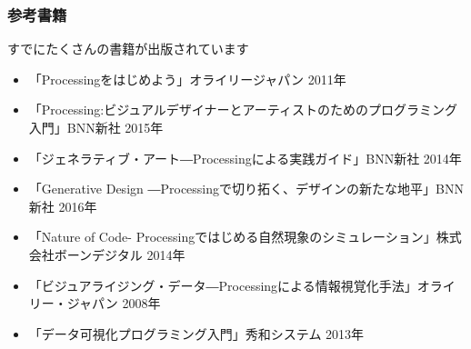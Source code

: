 \documentclass[dvipdfmx]{beamer}
\begin{document}
        \begin{frame}
            \frametitle{参考書籍}
            \tiny
            \begin{block}{すでにたくさんの書籍が出版されています}
                \begin{itemize}
                    \item 「Processingをはじめよう」オライリージャパン 2011年
                    \item 「Processing:ビジュアルデザイナーとアーティストのためのプログラミング入門」BNN新社 2015年
                    \item 「ジェネラティブ・アート―Processingによる実践ガイド」BNN新社 2014年
                    \item 「Generative Design ―Processingで切り拓く、デザインの新たな地平」BNN新社 2016年
                    \item 「Nature of Code- Processingではじめる自然現象のシミュレーション」株式会社ボーンデジタル 2014年
                    \item 「ビジュアライジング・データ―Processingによる情報視覚化手法」オライリー・ジャパン 2008年
                    \item 「データ可視化プログラミング入門」秀和システム 2013年
                \end{itemize}
            \end{block}
        \end{frame}

\end{document}
